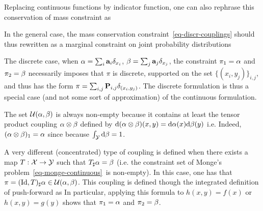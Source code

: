 Replacing continuous functions by indicator function, one can also rephrase this conservation of mass constraint as

In the general case, the mass conservation constraint~\eqref{eq-discr-couplings} should thus rewritten as a marginal constraint on joint probability distributions

The discrete case, when $\alpha=\sum_i \mathrm{\textbf{\upshape a}}_i \delta_{x_i}$, $\beta=\sum_j \mathrm{\textbf{\upshape a}}_j \delta_{x_j}$, the constraint $\pi_1=\alpha$ and $\pi_2=\beta$ necessarily imposes that $\pi$ is discrete, supported on the set $\{(x_i,y_j)\}_{i,j}$, and thus has the form $\pi = \sum_{i,j} \mathrm{\textbf{\upshape P}}_{i,j} \delta_{(x_i,y_j)}$. The discrete formulation is thus a special case (and not some sort of approximation) of the continuous formulation. 

The set $\mathcal{U}(\alpha,\beta)$ is always non-empty because it contains at least the tensor product coupling $\alpha \otimes \beta$ defined by $\mathrm{d}(\alpha\otimes\beta)(x,y)=\mathrm{d}\alpha(x)\mathrm{d}\beta(y)$ i.e.
Indeed, $(\alpha\otimes\beta)_1 = \alpha$ since
because $\int_{\mathcal{Y}} \mathrm{d}\beta=1$.

A very different (concentrated) type of coupling is defined when there exists a map $T: \mathcal{X} \rightarrow \mathcal{Y}$ such that $T_\sharp \alpha = \beta$ (i.e. the constraint set of Monge's problem~\eqref{eq-monge-continuous} is non-empty). In this case, one has that $\pi = (\mathrm{Id},T)_\sharp \alpha \in \mathcal{U}(\alpha,\beta)$. This coupling is defined though the integrated definition of push-forward as
In particular, applying this formula to $h(x,y)=f(x)$ or $h(x,y)=g(y)$  shows that $\pi_1=\alpha$ and $\pi_2=\beta$.



%
%


